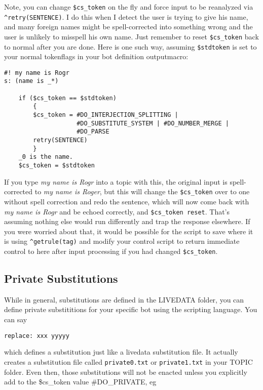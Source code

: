 \documentclass[]{article}
\begin{document}
Note, you can change \texttt{\$cs\_token} on the fly and force input to
be reanalyzed via \texttt{\^{}retry(SENTENCE)}. I do this when I detect
the user is trying to give his name, and many foreign names might be
spell-corrected into something wrong and the user is unlikely to
misspell his own name. Just remember to reset \texttt{\$cs\_token} back
to normal after you are done. Here is one such way, assuming
\texttt{\$stdtoken} is set to your normal tokenflags in your bot
definition outputmacro:

\begin{verbatim}
#! my name is Rogr
s: (name is _*)

    if ($cs_token == $stdtoken)
        {
        $cs_token = #DO_INTERJECTION_SPLITTING |
                    #DO_SUBSTITUTE_SYSTEM | #DO_NUMBER_MERGE |
                    #DO_PARSE
        retry(SENTENCE)
        }
    _0 is the name.
    $cs_token = $stdtoken
\end{verbatim}

If you type \emph{my name is Rogr} into a topic with this, the original
input is spell-corrected to \emph{my name is Roger}, but this will
change the \texttt{\$cs\_token} over to one without spell correction and
redo the sentence, which will now come back with \emph{my name is Rogr}
and be echoed correctly, and \texttt{\$cs\_token\ reset}. That's
assuming nothing else would run differently and trap the response
elsewhere. If you were worried about that, it would be possible for the
script to save where it is using \texttt{\^{}getrule(tag)} and modify
your control script to return immediate control to here after input
processing if you had changed \texttt{\$cs\_token}.

\subsection{Private Substitutions}\label{private-substitutions}

While in general, substitutions are defined in the LIVEDATA folder, you
can define private substititions for your specific bot using the
scripting language. You can say

\begin{verbatim}
replace: xxx yyyyy
\end{verbatim}

which defines a substitution just like a livedata substitution file. It
actually creates a substitution file called \texttt{private0.txt} or
\texttt{private1.txt} in your TOPIC folder. Even then, those
substitutions will not be enacted unless you explicitly add to the
\$cs\_token value \#DO\_PRIVATE, eg
\end{document}
